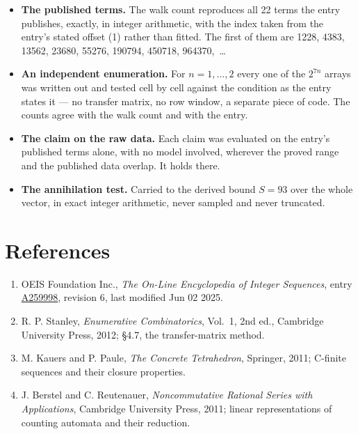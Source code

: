\documentclass[11pt]{article}
\theoremstyle{definition}
\begin{document}
\begin{itemize}

\item {\bfseries The published terms.} The walk count reproduces all 22 terms the entry publishes, exactly, in integer arithmetic, with the index taken from the entry's stated offset (1) rather than fitted. The first of them are 1228, 4383, 13562, 23680, 55276, 190794, 450718, 964370,~\dots

\item {\bfseries An independent enumeration.} For $n = 1,\dots,2$ every one of the $2^{7n}$ arrays was written out and tested cell by cell against the condition as the entry states it --- no transfer matrix, no row window, a separate piece of code. The counts agree with the walk count and with the entry.

\item {\bfseries The claim on the raw data.} Each claim was evaluated on the entry's published terms alone, with no model involved, wherever the proved range and the published data overlap. It holds there.

\item {\bfseries The annihilation test.} Carried to the derived bound $S = 93$ over the whole vector, in exact integer arithmetic, never sampled and never truncated.

\end{itemize}

\section{References}

\begin{enumerate}

\item OEIS Foundation Inc., \emph{The On-Line Encyclopedia of Integer Sequences}, entry \href{https://oeis.org/A259998}{A259998}, revision 6, last modified Jun 02 2025.

\item R. P. Stanley, \emph{Enumerative Combinatorics}, Vol.~1, 2nd ed., Cambridge University Press, 2012; \S4.7, the transfer-matrix method.

\item M. Kauers and P. Paule, \emph{The Concrete Tetrahedron}, Springer, 2011; C-finite sequences and their closure properties.

\item J. Berstel and C. Reutenauer, \emph{Noncommutative Rational Series with Applications}, Cambridge University Press, 2011; linear representations of counting automata and their reduction.

\end{enumerate}
\end{document}
